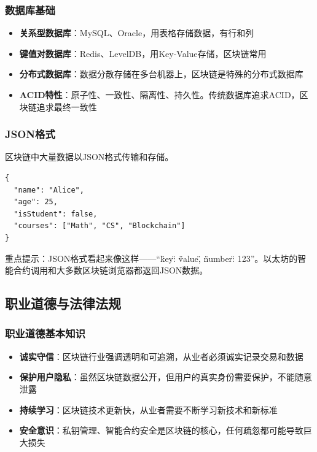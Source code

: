 ﻿\documentclass[12pt,a4paper]{article}
\begin{document}
\subsubsection{数据库基础}

\begin{itemize}[leftmargin=1.5em]
\item \textbf{关系型数据库}：MySQL、Oracle，用表格存储数据，有行和列
\item \textbf{键值对数据库}：Redis、LevelDB，用Key-Value存储，区块链常用
\item \textbf{分布式数据库}：数据分散存储在多台机器上，区块链是特殊的分布式数据库
\item \textbf{ACID特性}：原子性、一致性、隔离性、持久性。传统数据库追求ACID，区块链追求最终一致性
\end{itemize}

\subsubsection{JSON格式}

区块链中大量数据以JSON格式传输和存储。

\begin{lstlisting}
{
  "name": "Alice",
  "age": 25,
  "isStudent": false,
  "courses": ["Math", "CS", "Blockchain"]
}
\end{lstlisting}

重点提示：JSON格式看起来像这样——``{\"key\": \"value\", \"number\": 123}''。以太坊的智能合约调用和大多数区块链浏览器都返回JSON数据。

\subsection{职业道德与法律法规}

\subsubsection{职业道德基本知识}

\begin{itemize}[leftmargin=1.5em]
\item \textbf{诚实守信}：区块链行业强调透明和可追溯，从业者必须诚实记录交易和数据
\item \textbf{保护用户隐私}：虽然区块链数据公开，但用户的真实身份需要保护，不能随意泄露
\item \textbf{持续学习}：区块链技术更新快，从业者需要不断学习新技术和新标准
\item \textbf{安全意识}：私钥管理、智能合约安全是区块链的核心，任何疏忽都可能导致巨大损失
\end{itemize}
\end{document}
